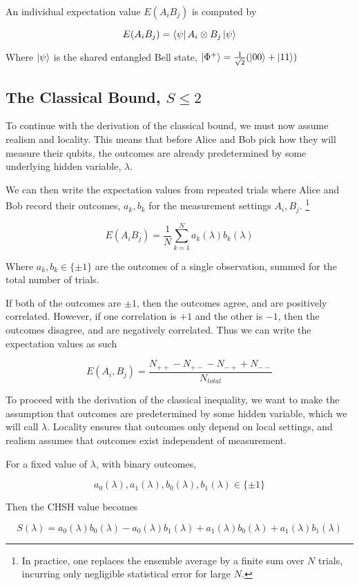 \documentclass[12pt]{article}
\begin{document}
An individual expectation value $E(A_iB_j)$ is computed by

$$
E(A_i B_j) = \bra{\psi} A_i \otimes B_j \ket{\psi}
$$

Where $\ket{\psi}$ is the shared entangled Bell state, $\ket{\Phi^+} = \frac{1}{\sqrt{2}}(\ket{00} + \ket{11})$

\subsection{The Classical Bound, $S \leq 2$}

To continue with the derivation of the classical bound, we must now assume realism and locality. This means that before Alice and Bob pick how they will measure their qubits, the outcomes are already predetermined by some underlying hidden variable, $\lambda$.

We can then write the expectation values from repeated trials where Alice and Bob record their outcomes, $a_k,b_k$ for the measurement settings $A_i,B_j$. \footnote{In practice, one replaces the ensemble average by a finite sum over $N$ trials, incurring only negligible statistical error for large $N$.}

\[
E(A_i B_j) = \frac{1}{N} \sum_{k=1}^{N} a_k(\lambda) b_k(\lambda)
\]

Where $a_k, b_k \in \{\pm1\}$ are the outcomes of a single observation, summed for the total number of trials.

If both of the outcomes are $\pm1$, then the outcomes agree, and are positively correlated. However, if one correlation is $+1$ and the other is $-1$, then  the outcomes disagree, and are negatively correlated. Thus we can write the expectation values as such


\[
E(A_i, B_j) = \frac{N_{++} - N_{+-} - N_{-+} + N_{--}}{N_{total}}
\]


To proceed with the derivation of the classical inequality, we want to make the assumption that outcomes are predetermined by some hidden variable, which we will call $\lambda$. Locality ensures that outcomes only depend on local settings, and realism assumes that outcomes exist independent of measurement.

For a fixed value of $\lambda$, with binary outcomes,

$$
a_0(\lambda), a_1(\lambda), b_0(\lambda), b_1(\lambda) \in \{\pm1\}
$$

Then the CHSH value becomes

$$
S(\lambda) = a_0(\lambda)b_0(\lambda) - a_0(\lambda)b_1(\lambda) + a_1(\lambda)b_0(\lambda) + a_1(\lambda)b_1(\lambda)
$$
\end{document}
